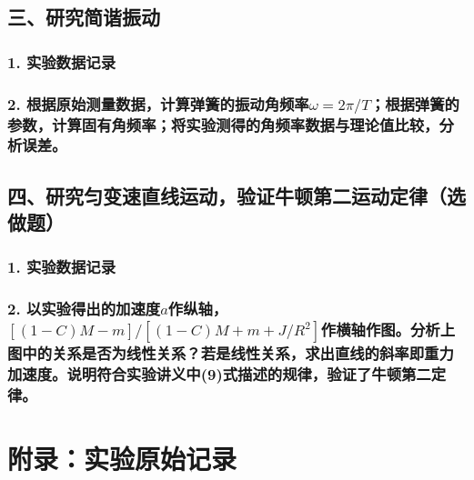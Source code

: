 \documentclass[dvipsnames, svgnames,a4paper,11pt]{article}
\newcommand{\recordblank}[1]{\par\vspace*{#1}\par}
\begin{document}
\subsection{三、研究简谐振动}

\subsubsection{1. 实验数据记录}
\recordblank{5.0cm}
\subsubsection{2. 根据原始测量数据，计算弹簧的振动角频率$\omega=2\pi/T$；根据弹簧的参数，计算固有角频率；将实验测得的角频率数据与理论值比较，分析误差。}
\recordblank{8.4cm}
\subsection{四、研究匀变速直线运动，验证牛顿第二运动定律（选做题）}

\subsubsection{1. 实验数据记录}
\recordblank{8.4cm}
\subsubsection{2. 以实验得出的加速度$a$作纵轴，$[(1-C)M-m]/[(1-C)M+m+J/R^2]$作横轴作图。分析上图中的关系是否为线性关系？若是线性关系，求出直线的斜率即重力加速度。说明符合实验讲义中(9)式描述的规律，验证了牛顿第二定律。}
\recordblank{6.2cm}
\section{附录：实验原始记录}


\recordblank{7cm}
\end{document}
